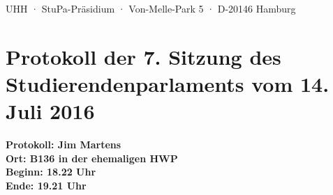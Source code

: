 \documentclass[ngerman,headheight=70pt]{scrartcl}
\begin{document}
    UHH · StuPa-Präsidium · Von-Melle-Park 5 · D-20146 Hamburg

    \section*{Protokoll der 7. Sitzung des Studierendenparlaments vom 14. Juli 2016}

    \textbf{Protokoll: Jim Martens}\\
    \textbf{Ort: B136 in der ehemaligen HWP}\\
    \textbf{Beginn: 18.22 Uhr}\\
    \textbf{Ende: 19.21 Uhr}

    \vspace{0.5cm}
\end{document}
